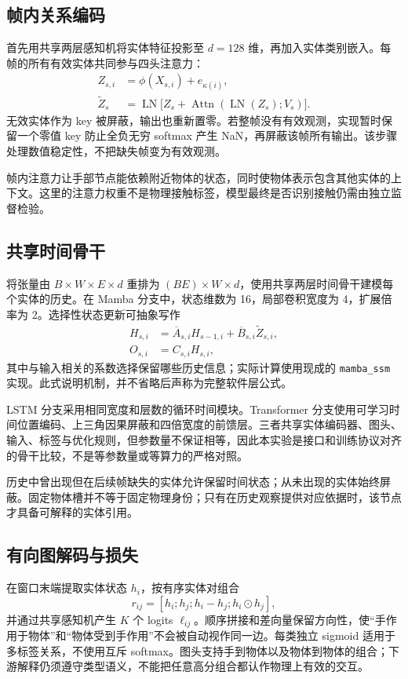\documentclass[10pt,twocolumn,letterpaper]{article}
\newcommand{\code}[1]{\texttt{\small #1}}
\begin{document}
\subsection{帧内关系编码}
首先用共享两层感知机将实体特征投影至 $d=128$ 维，再加入实体类别嵌入。每帧的所有有效实体共同参与四头注意力：
\begin{align}
 Z_{s,i}&=\phi(X_{s,i})+e_{\kappa(i)},\\
 \widetilde Z_s&=\operatorname{LN}\big[Z_s+
 \operatorname{Attn}(\operatorname{LN}(Z_s);V_s)\big].
\end{align}
无效实体作为 key 被屏蔽，输出也重新置零。若整帧没有有效观测，实现暂时保留一个零值 key 防止全负无穷 softmax 产生 NaN，再屏蔽该帧所有输出。该步骤处理数值稳定性，不把缺失帧变为有效观测。

帧内注意力让手部节点能依赖附近物体的状态，同时使物体表示包含其他实体的上下文。这里的注意力权重不是物理接触标签，模型最终是否识别接触仍需由独立监督检验。

\subsection{共享时间骨干}
将张量由 $B\times W\times E\times d$ 重排为 $(BE)\times W\times d$，使用共享两层时间骨干建模每个实体的历史。在 Mamba 分支中，状态维数为 16，局部卷积宽度为 4，扩展倍率为 2。选择性状态更新可抽象写作
\begin{align}
 H_{s,i}&=\overline A_{s,i}H_{s-1,i}
             +\overline B_{s,i}\widetilde Z_{s,i},\\
 O_{s,i}&=C_{s,i}H_{s,i},
\end{align}
其中与输入相关的系数选择保留哪些历史信息；实际计算使用现成的 \code{mamba\_ssm} 实现。此式说明机制，并不省略后声称为完整软件层公式。

LSTM 分支采用相同宽度和层数的循环时间模块。Transformer 分支使用可学习时间位置编码、上三角因果屏蔽和四倍宽度的前馈层。三者共享实体编码器、图头、输入、标签与优化规则，但参数量不保证相等，因此本实验是接口和训练协议对齐的骨干比较，不是等参数量或等算力的严格对照。

历史中曾出现但在后续帧缺失的实体允许保留时间状态；从未出现的实体始终屏蔽。固定物体槽并不等于固定物理身份；只有在历史观察提供对应依据时，该节点才具备可解释的实体引用。

\subsection{有向图解码与损失}
在窗口末端提取实体状态 $h_i$，按有序实体对组合
\begin{equation}
 r_{ij}=[h_i;h_j;h_i-h_j;h_i\odot h_j],
\end{equation}
并通过共享感知机产生 $K$ 个 logits $\ell_{ij}$。顺序拼接和差向量保留方向性，使“手作用于物体”和“物体受到手作用”不会被自动视作同一边。每类独立 sigmoid 适用于多标签关系，不使用互斥 softmax。图头支持手到物体以及物体到物体的组合；下游解释仍须遵守类型语义，不能把任意高分组合都认作物理上有效的交互。
\end{document}
